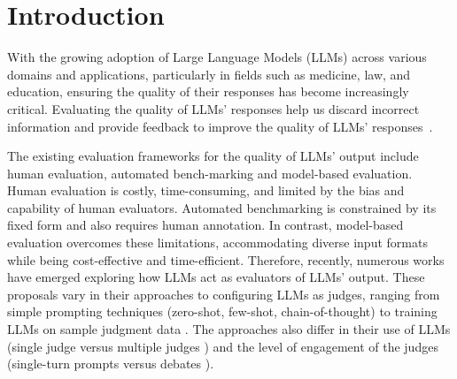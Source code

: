 \documentclass{article}
\theoremstyle{plain}
\theoremstyle{definition}
\theoremstyle{remark}
\begin{document}
\begin{abstract}
 Large language models (LLMs) are being widely applied across various fields, but as tasks become more complex, evaluating their responses is increasingly challenging. Compared to human evaluators, the use of LLMs to support performance evaluation offers a more efficient alternative. However, most studies focus mainly on aligning LLMs' judgments with human preferences, overlooking the existence of biases and mistakes in human judgment. Furthermore, how to select suitable LLM judgments given multiple potential LLM responses remains underexplored. To address these two aforementioned issues, we propose a three-stage meta-judge selection pipeline: 1) developing a comprehensive rubric with GPT-4 and human experts, 2) using three advanced LLM agents to score judgments, and 3) applying a threshold to filter out low-scoring judgments. Compared to methods using a single LLM as both judge and meta-judge, our pipeline introduces multi-agent collaboration and a more comprehensive rubric. Experimental results on the JudgeBench dataset show about 15.55\% improvement compared to raw judgments and about 8.37\% improvement over the single-agent baseline. Our work demonstrates the potential of LLMs as meta-judges and lays the foundation for future research on constructing preference datasets for LLM-as-a-judge reinforcement learning.
\end{abstract}


\section{Introduction}
With the growing adoption of Large Language Models (LLMs) across various domains and applications, particularly in fields such as medicine, law, and education, ensuring the quality of their responses has become increasingly critical\cite{hadi2023survey}. Evaluating the quality of LLMs' responses help us discard incorrect information and provide feedback to improve the quality of LLMs' responses~\cite{chang2024survey}.

The existing evaluation frameworks for the quality of LLMs' output include human evaluation, automated bench-marking and model-based evaluation. Human evaluation is costly, time-consuming, and limited by the bias and capability of human evaluators. Automated benchmarking is constrained by its fixed form and also requires human annotation. In contrast, model-based evaluation overcomes these limitations, accommodating diverse input formats while being cost-effective and time-efficient.
Therefore, recently, numerous works have emerged exploring how LLMs act as evaluators of LLMs' output. These proposals vary in their approaches to configuring LLMs as judges, ranging from simple prompting techniques (zero-shot, few-shot, chain-of-thought) \cite{15-stahl2024exploring} to training LLMs on sample judgment data \cite{16-chan2023chateval}. The approaches also differ in their use of LLMs (single judge versus multiple judges \cite{12-verga2024replacing}) and the level of engagement of the judges (single-turn prompts versus debates \cite{17-khan2024debating}). 
\end{document}
